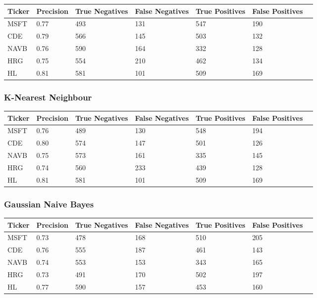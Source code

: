 \begin{center}
    \begin{tabular}{ | l | l | l | | l | l | l | p{5cm} |}
    \hline
    Ticker & Precision & True Negatives & False Negatives & True Positives & False Positives \\ \hline
    MSFT & 0.77 & 493 & 131 & 547 & 190 \\ \hline
    CDE & 0.79 & 566 & 145 & 503 & 132 \\ \hline
    NAVB & 0.76 & 590 & 164 & 332 & 128 \\ \hline
    HRG & 0.75 & 554 & 210 & 462 & 134 \\ \hline
    HL & 0.81 & 581 & 101 & 509 & 169 \\
    \hline
    \end{tabular}
\end{center}

\subsubsection{K-Nearest Neighbour}

\begin{center}
    \begin{tabular}{ | l | l | l | | l | l | l | p{5cm} |}
    \hline
    Ticker & Precision & True Negatives & False Negatives & True Positives & False Positives \\ \hline
    MSFT & 0.76 & 489 & 130 & 548 & 194 \\ \hline
    CDE & 0.80 & 574 & 147 & 501 & 126 \\ \hline
    NAVB & 0.75 & 573 & 161 & 335 & 145 \\ \hline
    HRG & 0.74 & 560 & 233 & 439 & 128 \\ \hline
    HL & 0.81 & 581 & 101 & 509 & 169 \\
    \hline
    \end{tabular}
\end{center}

\subsubsection{Gaussian Naive Bayes}

\begin{center}
    \begin{tabular}{ | l | l | l | | l | l | l | p{5cm} |}
    \hline
    Ticker & Precision & True Negatives & False Negatives & True Positives & False Positives \\ \hline
    MSFT & 0.73 & 478 & 168 & 510 & 205 \\ \hline
    CDE & 0.76 & 555 & 187 & 461 & 143 \\ \hline
    NAVB & 0.74 & 553 & 153 & 343 & 165 \\ \hline
    HRG & 0.73 & 491 & 170 & 502 & 197 \\ \hline
    HL & 0.77 & 590 & 157 & 453 & 160 \\
    \hline
    \end{tabular}
\end{center}

